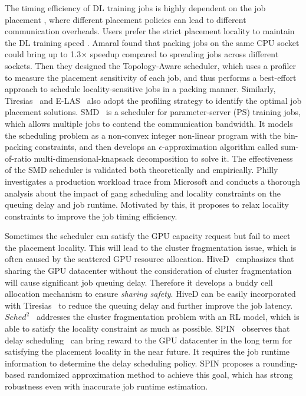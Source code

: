 The timing efficiency of DL training jobs is highly dependent on the job placement {\tiny{}}, where different placement policies can lead to different communication overheads. Users prefer the strict placement locality to maintain the DL training speed {\tiny{}}. Amaral \etal \cite{Topology-Aware} found that packing jobs on the same CPU socket could bring up to 1.3$\times$ speedup compared to spreading jobs across different sockets. Then they designed the Topology-Aware scheduler, which uses a profiler to measure the placement sensitivity of each job, and thus performs a best-effort approach to schedule locality-sensitive jobs in a packing manner.
Similarly, Tiresias~\cite{Tiresias} and E-LAS~\cite{E-LAS} also adopt the profiling strategy to identify the optimal job placement solutions. SMD~\cite{SMD} is a scheduler for parameter-server (PS) training jobs, which allows multiple jobs to contend the communication bandwidth. It models the scheduling problem as a non-convex integer non-linear program with the bin-packing constraints, and then develops an $\epsilon$-approximation algorithm called sum-of-ratio multi-dimensional-knapsack decomposition to solve it. The effectiveness of the SMD scheduler is validated both theoretically and empirically. Philly~\cite{Philly} investigates a production workload trace from Microsoft and conducts a thorough analysis about the impact of gang scheduling and locality constraints on the queuing delay and job runtime. Motivated by this, it proposes to relax locality constraints to improve the job timing efficiency.



Sometimes the scheduler can satisfy the GPU capacity request but fail to meet the placement locality. This will lead to the cluster fragmentation issue, which is often caused by the scattered GPU resource allocation. HiveD~\cite{HiveD} emphasizes that sharing the GPU datacenter without the consideration of cluster fragmentation will cause significant job queuing delay. Therefore it develops a buddy cell allocation mechanism to ensure \emph{sharing safety}. HiveD can be easily incorporated with Tiresias~\cite{Tiresias} to reduce the queuing delay and further improve the job latency. $Sched^2$~\cite{Sched2} addresses the cluster fragmentation problem with an RL model, which is able to satisfy the locality constraint as much as possible. SPIN~\cite{SPIN} observes that delay scheduling~\cite{zaharia2010delay} can bring reward to the GPU datacenter in the long term for satisfying the placement locality in the near future. It requires the job runtime information to determine the delay scheduling policy. SPIN proposes a rounding-based randomized approximation method to achieve this goal, which has strong robustness even with inaccurate job runtime estimation.

